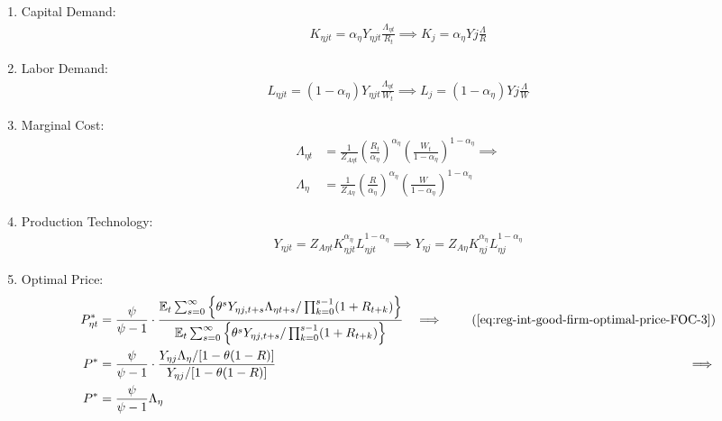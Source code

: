 \documentclass[
	thesis.tex
	]{subfiles}
\begin{document}
\begin{enumerate}
	\item Capital Demand:
	\begin{align}
		\label{eq:reg-ss-int-good-firm-FOC-Kt}
		K_{\eta jt} = {\alpha_\eta} Y_{\eta jt} \frac{\Lambda_{\eta t}}{R_t} \implies 
		K_{j} = {\alpha_\eta} Y{j} \frac{\Lambda}{R}
	\end{align}
	
	\item Labor Demand:
	\begin{align}
		\label{eq:reg-ss-int-good-firm-FOC-Lt}
		L_{\eta jt} = (1-{\alpha_\eta}) Y_{\eta jt} \frac{\Lambda_{\eta t}}{W_t} \implies 
		L_{j} = (1-{\alpha_\eta}) Y{j} \frac{\Lambda}{W}
	\end{align}
	
	
	\item Marginal Cost:
	\begin{align}
		\Lambda_{\eta t} &= \frac{1}{Z_{A\eta t}} \left( \frac{R_t}{{\alpha_\eta}} \right)^{{\alpha_\eta}} \left( \frac{W_t}{1-{\alpha_\eta}} \right)^{1-{\alpha_\eta}} \implies \nonumber \\
		\Lambda_{\eta} &= \frac{1}{Z_{A\eta}} \left( \frac{R}{{\alpha_\eta}} \right)^{{\alpha_\eta}} \left( \frac{W}{1-{\alpha_\eta}} \right)^{1-{\alpha_\eta}} \label{eq:reg-ss-int-good-firm-MC-2}
	\end{align}
	
	\item Production Technology:
	\begin{align}
		Y_{\eta jt} = Z_{A\eta t} K_{\eta jt}^{\alpha_\eta} L_{\eta jt}^{1-{\alpha_\eta}} \implies Y_{\eta j} = Z_{A\eta} K_{\eta j}^{\alpha_\eta} L_{\eta j}^{1-{\alpha_\eta}} \label{eq:reg-ss-int-good-firm-production-function}
	\end{align}
	
	\item Optimal Price:
	\begin{alignat}{2}
		P_{\eta t}^\ast &= \frac{\psi}{\psi-1} \cdot \frac{\E \sum_{s=0}^{\infty} \left\{\theta^s Y_{\eta j,t+s} \Lambda_{\eta t+s} / \prod_{k=0}^{s-1}(1+R_{t+k}) \right\}} {\E \sum_{s=0}^{\infty} \left\{ \theta^s Y_{\eta j,t+s} / \prod_{k=0}^{s-1}(1+R_{t+k}) \right\}} &\implies \tag{\ref{eq:reg-int-good-firm-optimal-price-FOC-3}} \\
		P^\ast &= \frac{\psi}{\psi-1} \cdot \frac{ Y_{\eta j} \Lambda_{\eta} / [1-\theta(1-R)]} {Y_{\eta j} / [1-\theta(1-R)]} &\implies \nonumber \\
		P^\ast &= \frac{\psi}{\psi-1} \Lambda_{\eta} \label{eq:reg-ss-int-good-firm-optimal-price-FOC-3}
	\end{alignat}
	

\end{enumerate}
\end{document}

